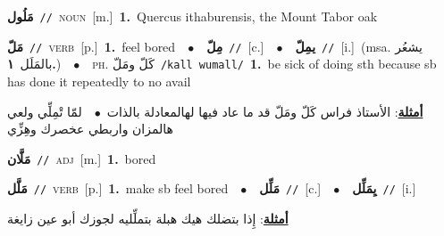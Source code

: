 \documentclass[10pt,a4paper,twoside]{article} %
\begin{document}
\begin{multicols}{2}
{\setlength\topsep{0pt}\textbf{\foreignlanguage{arabic}{مَلُول}}\ {\color{gray}\texttt{//}\color{black}}\ \textsc{noun}\ [m.]\ \textbf{1.}~Quercus ithaburensis, the Mount Tabor oak\ } \vspace{2mm}

{\setlength\topsep{0pt}\textbf{\foreignlanguage{arabic}{مَلّ}}\ {\color{gray}\texttt{//}\color{black}}\ \textsc{verb}\ [p.]\ \textbf{1.}~feel bored\ \ $\bullet$\ \ \setlength\topsep{0pt}\textbf{\foreignlanguage{arabic}{مِلّ}}\ {\color{gray}\texttt{//}\color{black}}\ [c.]\ \ $\bullet$\ \ \setlength\topsep{0pt}\textbf{\foreignlanguage{arabic}{يمِلّ}}\ {\color{gray}\texttt{//}\color{black}}\ [i.]\ \color{gray}(msa. \foreignlanguage{arabic}{يشعُر بالمَلَل}~\foreignlanguage{arabic}{\textbf{١.}})\color{black}\ \ $\bullet$\ \ \textsc{ph.} \color{gray} \foreignlanguage{arabic}{كَلّ ومَلّ}\color{black}\ {\color{gray}\texttt{/{\sffamily kall wumall}/}\color{black}}\ \textbf{1.}~be sick of doing sth because sb has done it repeatedly to no avail\  \begin{flushright}\color{gray}\foreignlanguage{arabic}{\textbf{\underline{\foreignlanguage{arabic}{أمثلة}}}: الأستاذ فراس كَلّ ومَلّ قد ما عاد فيها لهالمعادلة بالذات\ $\bullet$\ \  لمّا تْمِلِّي ولعي هالمزان واربطي عخصرك وهِزِّي}\end{flushright}\color{black}} \vspace{2mm}

{\setlength\topsep{0pt}\textbf{\foreignlanguage{arabic}{مَلَّان}}\ {\color{gray}\texttt{//}\color{black}}\ \textsc{adj}\ [m.]\ \textbf{1.}~bored\ } \vspace{2mm}

{\setlength\topsep{0pt}\textbf{\foreignlanguage{arabic}{مَلَّل}}\ {\color{gray}\texttt{//}\color{black}}\ \textsc{verb}\ [p.]\ \textbf{1.}~make sb feel bored\ \ $\bullet$\ \ \setlength\topsep{0pt}\textbf{\foreignlanguage{arabic}{مَلِّل}}\ {\color{gray}\texttt{//}\color{black}}\ [c.]\ \ $\bullet$\ \ \setlength\topsep{0pt}\textbf{\foreignlanguage{arabic}{يِمَلِّل}}\ {\color{gray}\texttt{//}\color{black}}\ [i.]\  \begin{flushright}\color{gray}\foreignlanguage{arabic}{\textbf{\underline{\foreignlanguage{arabic}{أمثلة}}}: إِذا بتضلك هيك هبلة بتملِّليه لجوزك أبو عين زايغة}\end{flushright}\color{black}} \vspace{2mm}


\end{multicols}
\end{document}
